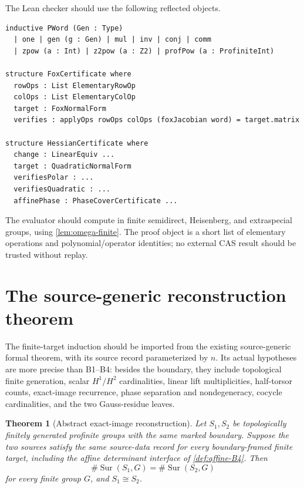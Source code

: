 \documentclass[11pt,reqno]{amsart}
\newtheorem{theorem}{Theorem}[section]
\theoremstyle{remark}
\numberwithin{equation}{section}
\newcommand{\Sur}{\operatorname{Sur}}
\begin{document}
The Lean checker should use the following reflected objects.
\begin{verbatim}
inductive PWord (Gen : Type)
  | one | gen (g : Gen) | mul | inv | conj | comm
  | zpow (a : Int) | z2pow (a : Z2) | profPow (a : ProfiniteInt)

structure FoxCertificate where
  rowOps : List ElementaryRowOp
  colOps : List ElementaryColOp
  target : FoxNormalForm
  verifies : applyOps rowOps colOps (foxJacobian word) = target.matrix

structure HessianCertificate where
  change : LinearEquiv ...
  target : QuadraticNormalForm
  verifiesPolar : ...
  verifiesQuadratic : ...
  affinePhase : PhaseCoverCertificate ...
\end{verbatim}
The evaluator should compute in finite semidirect, Heisenberg, and
extraspecial groups, using \cref{lem:omega-finite}.  The proof object is a
short list of elementary operations and polynomial/operator identities;
no external CAS result should be trusted without replay.

\section{The source-generic reconstruction theorem}

The finite-target induction should be imported from the existing
source-generic formal theorem, with its source record parameterized by
\(n\).  Its actual hypotheses are more precise than B1--B4: besides the
boundary, they include topological finite generation, scalar
\(H^1/H^2\) cardinalities, linear lift multiplicities, half-torsor
counts, exact-image recurrence, phase separation and nondegeneracy,
cocycle cardinalities, and the two Gauss-residue leaves.

\begin{theorem}[Abstract exact-image reconstruction]
\label{thm:source-abstract}
Let \(S_1,S_2\) be topologically finitely generated profinite groups with
the same marked boundary.  Suppose the two sources satisfy the same
source-data record for every boundary-framed finite target, including the
affine determinant interface of \cref{def:affine-B4}.  Then
\[
 \#\Sur(S_1,G)=\#\Sur(S_2,G)
\]
for every finite group \(G\), and \(S_1\cong S_2\).
\end{theorem}
\end{document}
